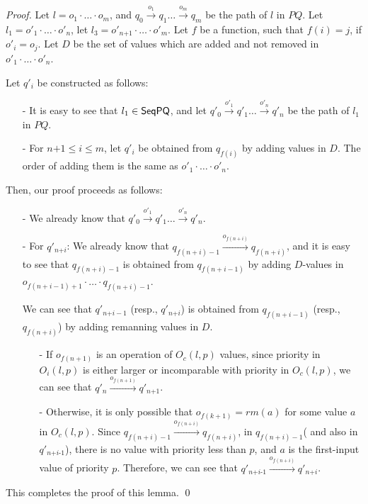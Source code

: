 \begin {proof}
Let $l=o_1 \cdot \ldots \cdot o_m$, and $q_0 \xrightarrow{o_1} q_1 \ldots \xrightarrow{o_m} q_m$ be the path of $l$ in $\textit{PQ}$. Let $l_1 = o'_1 \cdot \ldots \cdot o'_n$, let $l_3 = o'_{\textit{n+1}} \cdot \ldots \cdot o'_m$. Let $f$ be a function, such that $f(i)=j$, if $o'_i = o_j$. Let $D$ be the set of values which are added and not removed in $o'_1 \cdot \ldots \cdot o'_n$.

Let $q'_i$ be constructed as follows:

\begin{itemize}
\setlength{\itemsep}{0.5pt}
\item[-] It is easy to see that $l_1 \in \mathsf{SeqPQ}$, and let $q'_0 \xrightarrow{o'_1} q'_1 \ldots \xrightarrow{o'_n} q'_n$ be the path of $l_1$ in $\textit{PQ}$.

\item[-] For $\textit{n+1} \leq i \leq m$, let $q'_i$ be obtained from $q_{f(i)}$ by adding values in $D$. The order of adding them is the same as $o'_1 \cdot \ldots \cdot o'_n$.
\end{itemize}

Then, our proof proceeds as follows:

\begin{itemize}
\setlength{\itemsep}{0.5pt}
\item[-] We already know that $q'_0 \xrightarrow{o'_1} q'_1 \ldots \xrightarrow{o'_n} q'_n$.

\item[-] For $q'_{\textit{n+i}}$: We already know that $q_{f(n+i)-1} \xrightarrow{o_{f(n+i)}} q_{f(n+i)}$, and it is easy to see that $q_{f(n+i)-1}$ is obtained from $q_{f(n+i-1)}$ by adding $D$-values in $o_{f(n+i-1)+1} \cdot \ldots \cdot q_{f(n+i)-1}$.

     We can see that $q'_{\textit{n+i}-1}$ (resp., $q'_{\textit{n+i}}$) is obtained from $q_{f(n+i-1)}$ (resp., $q_{f(n+i)}$) by adding remanning values in $D$.

    \begin{itemize}
    \setlength{\itemsep}{0.5pt}
    \item[-] If $o_{f(n+1)}$ is an operation of $O_c(l,p)$ values, since priority in $O_i(l,p)$ is either larger or incomparable with priority in $O_c(l,p)$, we can see that $q'_n \xrightarrow{o_{f(n+1)}} q'_{\textit{n+1}}$.

    \item[-] Otherwise, it is only possible that $o_{f(k+1)} = \textit{rm}(a)$ for some value $a$ in $O_c(l,p)$. Since $q_{f(n+i)-1} \xrightarrow{o_{f(n+i)}} q_{f(n+i)}$, in $q_{f(n+i)-1}$( and also in $q'_{\textit{n+i-1}}$), there is no value with priority less than $p$, and $a$ is the first-input value of priority $p$. Therefore, we can see that $q'_{\textit{n+i-1}} \xrightarrow{o_{f(n+i)}} q'_{\textit{n+i}}$.
    \end{itemize}
\end{itemize}

This completes the proof of this lemma. \qed
\end {proof}

